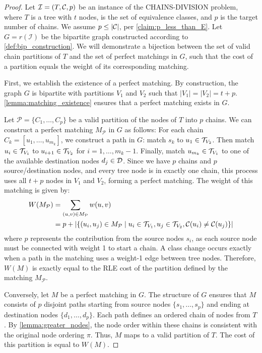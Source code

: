 \begin{proof}
    Let $\mathcal{I} = (T, \mathcal{C}, p)$ be an instance of the \textsc{CHAINS-DIVISION} problem, where $T$ is a tree with $t$ nodes, \equivsetmath is the set of equivalence classes, and $p$ is the target number of chains. We assume $p \leq |\mathcal{C}|$, per \cref{claim:p_less_than_E}. Let $G = r(\mathcal{I})$ be the bipartite graph constructed according to \cref{def:bip_construction}. We will demonstrate a bijection between the set of valid chain partitions of $T$ and the set of perfect matchings in $G$, such that the cost of a partition equals the weight of its corresponding matching.

    First, we establish the existence of a perfect matching. By construction, the graph $G$ is bipartite with partitions $V_1$ and $V_2$ such that $|V_1| = |V_2| = t+p$. \cref{lemma:matching_existence} ensures that a perfect matching exists in $G$.

    Let $\mathcal{P} = \{C_1, \dots, C_p\}$ be a valid partition of the nodes of $T$ into $p$ chains. We can construct a perfect matching $M_\mathcal{P}$ in $G$ as follows:  For each chain $C_k = [u_{1}, \dots, u_{m_k}]$, we construct a path in $G$: match $s_k$ to $u_{1} \in \mathcal{T}_{V_2}$. Then match $u_{i} \in \mathcal{T}_{V_1}$ to $u_{i+1} \in \mathcal{T}_{V_2}$ for $i=1, \dots, m_k-1$. Finally, match $u_{m_k} \in \mathcal{T}_{V_1}$ to one of the available destination nodes $d_j \in \mathcal{D}$. Since we have $p$ chains and $p$ source/destination nodes, and every tree node is in exactly one chain, this process uses all $t+p$ nodes in $V_1$ and $V_2$, forming a perfect matching. The weight of this matching is given by:
    \begin{align*}
        W(M_\mathcal{P}) &= \sum_{(u,v) \in M_\mathcal{P}} w(u,v) \\
        &= p + |\{ (u_i, u_j) \in M_\mathcal{P} \mid u_i \in \mathcal{T}_{V_1}, u_j \in \mathcal{T}_{V_2}, \mathcal{C}(u_i) \neq \mathcal{C}(u_j) \}|
    \end{align*}
    where $p$ represents the contribution from the source nodes $s_i$, as each source node must be connected with weight 1 to start a chain. A class change occurs exactly when a path in the matching uses a weight-1 edge between tree nodes.
    Therefore, $W(M)$ is exactly equal to the RLE cost of the partition defined by the matching $M_\mathcal{P}$.

    Conversely, let $M$ be a perfect matching in $G$. The structure of $G$ ensures that $M$ consists of $p$ disjoint paths starting from source nodes $\{s_1, \dots, s_p\}$ and ending at destination nodes $\{d_1, \dots, d_p\}$. Each path defines an ordered chain of nodes from $T$. By \cref{lemma:greater_nodes}, the node order within these chains is consistent with the original node ordering $\pi$. Thus, $M$ maps to a valid partition of $T$. The cost of this partition is equal to $W(M)$.


\end{proof}
